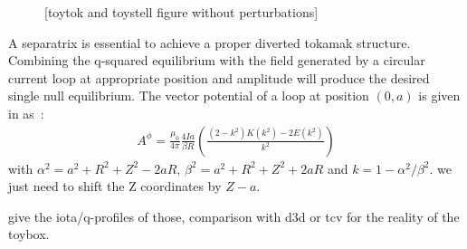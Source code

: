 \begin{figure}[h!]
    \hfill
    \hfill
    \hfill
    \caption{[toytok and toystell figure without perturbations]}
    \label{fig:toytok-toystell}
\end{figure}

A separatrix is essential to achieve a proper diverted tokamak structure. Combining the q-squared equilibrium with the field generated by a circular current loop at appropriate position and amplitude will produce the desired single null equilibrium. The vector potential of a loop at position $(0, a)$ is given in \cite{simpson_simple_2001} as~:
\begin{align*}
    A^\phi = \frac{\mu_0}{4\pi}\frac{4Ia}{\beta R}\left(\frac{(2-k^2)K(k^2)-2E(k^2)}{k^2}\right)
\end{align*}
with $\alpha^2 = a^2 + R^2 + Z^2 - 2aR$, $\beta^2 = a^2+R^2+Z^2+2aR$ and $k = 1 - \alpha^2/\beta^2$. we just need to shift the Z coordinates by $Z-a$.

give the iota/q-profiles of those, comparison with d3d or tcv for the reality of the toybox.

